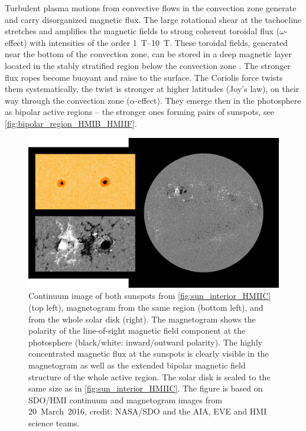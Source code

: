 
Turbulent plasma motions from convective flows in the convection zone generate and carry disorganized magnetic flux. The large rotational shear at the tachocline stretches and amplifies the magnetic fields to strong coherent toroidal flux ($\omega$-effect) with intensities of the order \SIrange{1}{10}{\tesla}. These toroidal fields, generated near the bottom of the convection zone, can be stored in a deep magnetic layer located in the stably stratified region below the convection zone \citep{Ossendrijver2003}. The stronger flux ropes become buoyant and raise to the surface. The Coriolis force twists them systematically, the twist is stronger at higher latitudes (Joy's law), on their way through the convection zone ($\alpha$-effect). They emerge then in the photosphere as bipolar active regions -- the stronger ones forming pairs of sunspots, see \autoref{fig:bipolar_region_HMIB_HMIIF}.
\begin{figure}[htb]
	\centering
	\includegraphics[width=\textwidth]{images/own_figures/bipolar_region_HMIB_HMIIF.png}
	\caption{Continuum image of both sunspots from \autoref{fig:sun_interior_HMIIC} (top left), magnetogram from the same region (bottom left), and from the whole solar disk (right). The magnetogram shows the polarity of the line-of-sight magnetic field component at the photosphere (black/white: inward/outward polarity). The highly concentrated magnetic flux at the sunspots is clearly visible in the magnetogram as well as the extended bipolar magnetic field structure of the whole active region. The solar disk is scaled to the same size as in \autoref{fig:sun_interior_HMIIC}. The figure is based on SDO/HMI continuum and magnetogram images from 20~March~2016, credit: NASA/SDO and the AIA, EVE and HMI science teams.}
	\label{fig:bipolar_region_HMIB_HMIIF}
\end{figure}
